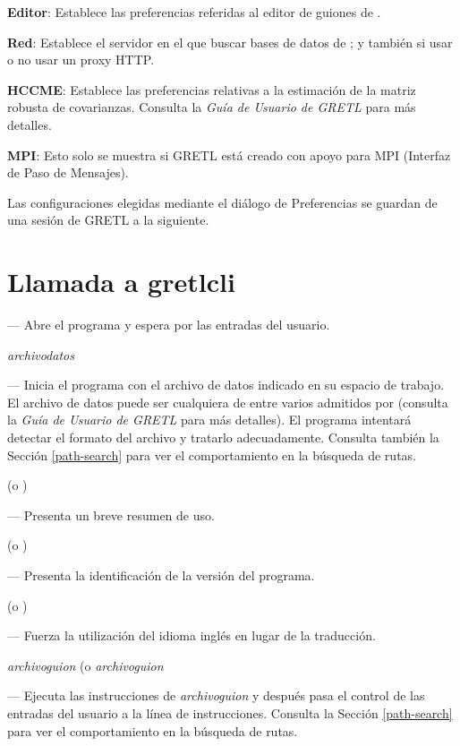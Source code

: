 \textbf{Editor}: Establece las preferencias referidas al editor de guiones de
.

\textbf{Red}: Establece el servidor en el que buscar bases de datos de
; y también si usar o no usar un proxy HTTP.
      
\textbf{HCCME}: Establece las preferencias relativas a la estimación de la matriz
robusta de covarianzas. Consulta la \emph{Guía de Usuario de GRETL} para más detalles.
      
\textbf{MPI}: Esto solo se muestra si GRETL está creado con apoyo para MPI
(Interfaz de Paso de Mensajes).
      
Las configuraciones elegidas mediante el diálogo de Preferencias se guardan
de una sesión de GRETL a la siguiente.
      
\section{Llamada a gretlcli}
\label{optarg2}


--- Abre el programa y espera por las entradas del usuario.
      
 \textsl{archivodatos}

--- Inicia el programa con el archivo de datos indicado en su espacio de trabajo.
El archivo de datos puede ser cualquiera de entre varios admitidos por
 (consulta la \emph{Guía de Usuario de GRETL} para más detalles).
El programa intentará detectar el formato del archivo y tratarlo adecuadamente.
Consulta también la Sección \ref{path-search} para ver el comportamiento en la búsqueda de rutas.

 (o )

--- Presenta un breve resumen de uso.

 (o )

--- Presenta la identificación de la versión del programa.

 (o )

--- Fuerza la utilización del idioma inglés en lugar de la traducción.

 \textsl{archivoguion} (o 
\textsl{archivoguion}

--- Ejecuta las instrucciones de \textsl{archivoguion} y después pasa el control
de las entradas del usuario a la línea de instrucciones. Consulta la Sección
\ref{path-search} para ver el comportamiento en la búsqueda de rutas.

